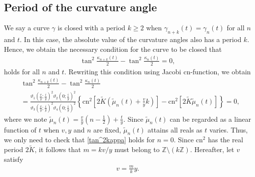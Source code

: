 \documentclass[10pt,leqno]{amsart}
\numberwithin{equation}{section}
\begin{document}
\subsection{Period of the curvature angle}\label{subsection:Period of the curvature angle}
We say a curve $\gamma$ is closed with a period $k\geq 2$
when $\gamma_{n+k}(t)=\gamma_n(t)$ for all $n$ and $t$.
In this case, the absolute value of the curvature angles also has a period $k$.
Hence, we obtain the necessary condition for the curve to be closed that 
\begin{equation}
\begin{split}
\tan^2\frac{\kappa_{n+k}(t)}{2}-\tan^2\frac{\kappa_n(t)}{2}=0,
\end{split}
\end{equation}
holds for all $n$ and $t$.
Rewriting this condition using Jacobi $\mathrm{cn}$-function, we obtain
\begin{equation}\label{tan^2kappa}
\begin{split}
&\tan^2\frac{\kappa_{n+k}(t)}{2}-\tan^2\frac{\kappa_n(t)}{2}\\
&=\frac{\vartheta_1\left(\frac{v}{y};\frac{i}{y}\right)^2\vartheta_2\left(0;\frac{i}{y}\right)^2}{\vartheta_3\left(\frac{v}{y};\frac{i}{y}\right)^2\vartheta_4\left(0;\frac{i}{y}\right)^2}\left\{\mathrm{cn}^2\left[2\tilde{K}\left(\tilde{\mu}_n(t)+\frac{v}{y}k\right)\right]-\mathrm{cn}^2\left[2\tilde{K}\tilde{\mu}_n(t)\right]\right\}=0,
\end{split}
\end{equation}
where we note $\tilde{\mu}_n(t)=\frac{v}{y}\left(n-\frac{1}{2}\right)+\frac{t}{y}$.
Since $\tilde{\mu}_n(t)$ can be regarded as a linear function of $t$ when $v, y$ and $n$ are fixed, $\tilde{\mu}_n(t)$ attains all reals as $t$ varies.
Thus, we only need to check that \eqref{tan^2kappa} holds for $n=0$.
Since $\mathrm{cn}^2$ has the real period $2\tilde{K}$, it follows that $m=kv/y$ must belong to $\mathbb{Z}\setminus(k\mathbb{Z})$.
Hereafter, let $v$ satisfy 
\begin{align}\label{kvy}
    v=\frac{m}{k}y.
\end{align}
\end{document}
